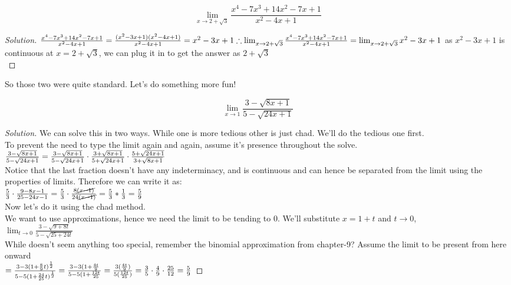 \begin{example}
    \[\lim_{x \to 2+\sqrt{3}}\frac{x^4-7x^3+14x^2-7x+1}{x^2-4x+1}\]
\end{example}
\begin{proof}
    [Solution]
    $\frac{x^4-7x^3+14x^2-7x+1}{x^2-4x+1}
    = \frac{(x^2-3x+1)(x^2-4x+1)}{x^2-4x+1}\\
    = x^2-3x+1\\
    \therefore \lim_{x \to 2+\sqrt{3}}\frac{x^4-7x^3+14x^2-7x+1}{x^2-4x+1}\\
    = \lim_{x \to 2+\sqrt{3}} x^2-3x+1$ as $x^2-3x+1$ is continuous at $x=2+\sqrt{3}$, we can plug it in to get the answer as $2+\sqrt{3}$ \\
\end{proof}
So those two were quite standard. Let's do something more fun!
\begin{example}
    \[\lim_{x \to 1} \frac{3-\sqrt{8x+1}}{5-\sqrt{24x+1}}\]
\end{example}
\begin{proof}
    [Solution]
    We can solve this in two ways. While one is more tedious other is just chad. We'll do the tedious one first.\\
    To prevent the need to type the limit again and again, assume it's presence throughout the solve.\\
    $\frac{3-\sqrt{8x+1}}{5-\sqrt{24x+1}}\\
    = \frac{3-\sqrt{8x+1}}{5-\sqrt{24x+1}}\cdot\frac{3+\sqrt{8x+1}}{5+\sqrt{24x+1}}\cdot\frac{5+\sqrt{24x+1}}{3+\sqrt{8x+1}}$\\
    Notice that the last fraction doesn't have any indeterminacy, and is continuous and can hence be separated from the limit using the properties of limits. Therefore we can write it as:\\
    $\frac{5}{3} \cdot \frac{9-8x-1}{25-24x-1}\\
    = \frac{5}{3} \cdot \frac{8\cancel{(x-1)}}{24\cancel{(x-1)}}\\
    = \frac{5}{3}*\frac{1}{3}=\frac{5}{9}$\\
    Now let's do it using the chad method.\\
    We want to use approximations, hence we need the limit to be tending to 0. We'll substitute $x=1+t$ and $t \to 0$,\\
    $\lim_{t \to 0} \frac{3-\sqrt{9+8t}}{5-\sqrt{25+24t}}$\\ While doesn't seem anything too special, remember the binomial approximation from chapter-9? Assume the limit to be present from here onward\\
    $=\frac{3-3(1+\frac{8}{9}t)^{\frac{1}{2}}}{5-5(1+\frac{24}{25}t)^{\frac{1}{2}}}\\
    = \frac{3-3(1+\frac{4t}{9}}{5-5(1+\frac{12t}{25}}\\
    =\frac{3(\frac{4t}{9})}{5(\frac{12t}{25})}\\
    =\frac{3}{5}\cdot \frac{4}{9} \cdot \frac{25}{12}\\
    =\frac{5}{9}$
\end{proof}
